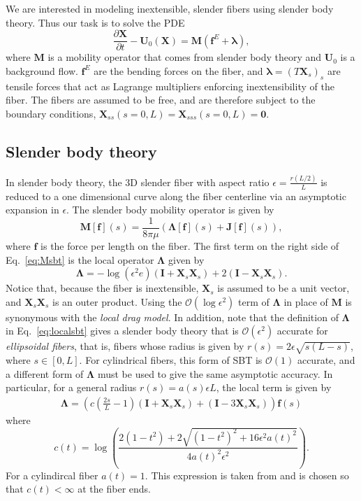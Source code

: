 We are interested in modeling inextensible, slender fibers using slender body theory. Thus our task is to solve the PDE
\begin{equation}
\label{eq:fibevcont}
\frac{\partial \bm{X}}{\partial t} -\bm{U}_0(\bm{X})= \bm{M}\left(\bm{f}^{E}+\bm{\lambda}\right),
\end{equation}
where $\bm{M}$ is a mobility operator that comes from slender body theory and $\bm{U}_0$ is a background flow. $\bm{f}^E$ are the bending forces on the fiber, and $\bm{\lambda}=(T\bm{X}_s)_s$ are tensile forces that act as Lagrange multipliers enforcing inextensibility of the fiber. The fibers are assumed to be free, and are therefore subject to the boundary conditions, $\displaystyle \bm{X}_{ss}\left(s=0,L\right)=\bm{X}_{sss}\left(s=0,L\right)=\bm{0}$. 

\subsection{Slender body theory}
In slender body theory, the 3D slender fiber with aspect ratio $\displaystyle{\epsilon = \frac{r(L/2)}{L}}$ is reduced to a one dimensional curve along the fiber centerline via an asymptotic expansion in $\epsilon$. The slender body mobility operator is given by
\begin{equation}
\label{eq:Msbt}
\bm{M}[\bm{f}](s) =\frac{1}{8\pi \mu}\left( \bm{ \Lambda}[\bm{f}](s)+\bm{J}[\bm{f}](s)\right),
\end{equation}
where $\bm{f}$ is the force per length on the fiber. The first term on the right side of Eq.\ \eqref{eq:Msbt} is the local operator $\bm{\Lambda}$ given by
\begin{equation}
\label{eq:localsbt}
\bm{\Lambda}=-\log{(\epsilon^2 e)}(\bm{I}+\bm{X}_s \bm{X}_s) + 2(\bm{I}-\bm{X}_s \bm{X}_s). 
\end{equation}
Notice that, because the fiber is inextensible, $\bm{X}_s$ is assumed to be a unit vector, and $\bm{X}_s \bm{X}_s$ is an outer product. Using the $\mathcal{O}(\log{\epsilon^2})$ term of $\bm{\Lambda}$ in place of $\bm{M}$ is synonymous with the \textit{local drag model}. In addition, note that the definition of $\bm{\Lambda}$ in Eq.\ \eqref{eq:localsbt} gives a slender body theory that is $\mathcal{O}(\epsilon^2)$ accurate for \textit{ellipsoidal fibers}, that is, fibers whose radius is given by $r(s)=2\epsilon \sqrt{s(L-s)}$, where $s\in[0,L]$. For cylindrical fibers, this form of SBT is $\mathcal{O}(1)$ accurate, and a different form of $\bm{\Lambda}$ must be used to give the same asymptotic accuracy. In particular, for a general radius $r(s)=a(s)\epsilon L$, the local term is given by  
\begin{align}
\bm{\Lambda} =\left(c\left(\frac{2s}{L}-1\right)(\bm{I}+\bm{X}_s\bm{X}_s) +  (\bm{I}-3\bm{X}_s\bm{X}_s)\right)\bm{f}(s)
\end{align}
where
\begin{equation}
c(t) = \log{\left(\frac{2(1-t^2)+2\sqrt{(1-t^2)^2+16\epsilon^2a(t)^2}}{4a(t)^2\epsilon^2}\right)}.
\end{equation}
For a cylindircal fiber $a(t)=1$. This expression is taken from \cite{morifree} and is chosen so that $c(t) < \infty$ at the fiber ends.

